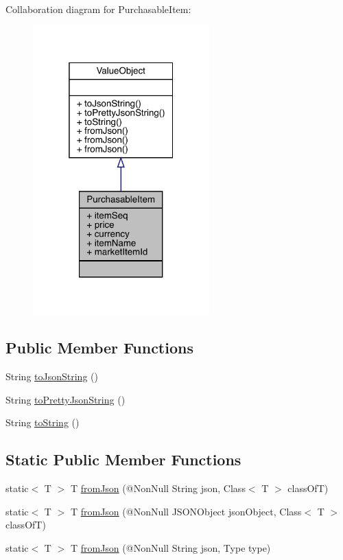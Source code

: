 Collaboration diagram for Purchasable\+Item\+:
\nopagebreak
\begin{figure}[H]
\begin{center}
\leavevmode
\includegraphics[width=193pt]{classcom_1_1toast_1_1android_1_1gamebase_1_1base_1_1purchase_1_1_purchasable_item__coll__graph}
\end{center}
\end{figure}
\subsection*{Public Member Functions}
\begin{DoxyCompactItemize}
\item 
String \hyperlink{classcom_1_1toast_1_1android_1_1gamebase_1_1base_1_1_value_object_a58acf6402880e9769d79d8667581fa6a}{to\+Json\+String} ()
\item 
String \hyperlink{classcom_1_1toast_1_1android_1_1gamebase_1_1base_1_1_value_object_a054431f3d988a22295cfc8b784ff2637}{to\+Pretty\+Json\+String} ()
\item 
String \hyperlink{classcom_1_1toast_1_1android_1_1gamebase_1_1base_1_1_value_object_ad146fa8579a5f8a876c4688cc5a68520}{to\+String} ()
\end{DoxyCompactItemize}
\subsection*{Static Public Member Functions}
\begin{DoxyCompactItemize}
\item 
static$<$ T $>$ T \hyperlink{classcom_1_1toast_1_1android_1_1gamebase_1_1base_1_1_value_object_ae6655c88c20a9a8406dc11b46250ac7b}{from\+Json} (@Non\+Null String json, Class$<$ T $>$ class\+OfT)
\item 
static$<$ T $>$ T \hyperlink{classcom_1_1toast_1_1android_1_1gamebase_1_1base_1_1_value_object_ab83c4196ee2e3f11553bbe0f04dc2101}{from\+Json} (@Non\+Null J\+S\+O\+N\+Object json\+Object, Class$<$ T $>$ class\+OfT)
\item 
static$<$ T $>$ T \hyperlink{classcom_1_1toast_1_1android_1_1gamebase_1_1base_1_1_value_object_aa901d97d495150b54bcb80c05672f58a}{from\+Json} (@Non\+Null String json, Type type)
\end{DoxyCompactItemize}
